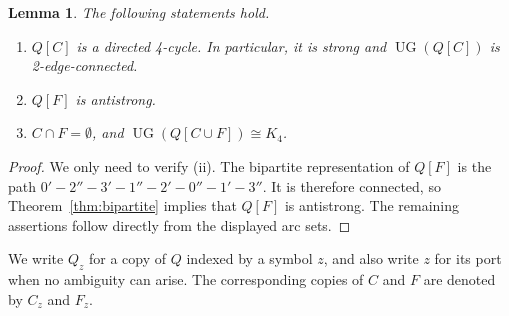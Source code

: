 \documentclass[12pt]{article}
\newtheorem{lemma}[theorem]{Lemma}
\theoremstyle{remark}
\newcommand{\UG}{\operatorname{UG}}
\begin{document}
\begin{lemma}\label{lem:switch}
The following statements hold.
\begin{enumerate}
\renewcommand{\labelenumi}{\textup{(\roman{enumi})}}
\item $Q[C]$ is a directed 4-cycle.  In particular, it is strong and
$\UG(Q[C])$ is 2-edge-connected.
\item $Q[F]$ is antistrong.
\item $C\cap F=\emptyset$, and $\UG(Q[C\cup F])\cong K_4$.
\end{enumerate}
\end{lemma}

\begin{proof}
We only need to verify (ii). The bipartite representation of $Q[F]$ is the path
$0'-2''-3'-1''-2'-0''-1'-3''$.
It is therefore connected, so Theorem~\ref{thm:bipartite} implies that $Q[F]$ is antistrong.  The remaining assertions follow directly from the displayed arc sets.
\end{proof}

We write $Q_z$ for a copy of $Q$ indexed by a symbol $z$, and also
write $z$ for its port when no ambiguity can arise.  The corresponding
copies of $C$ and $F$ are denoted by $C_z$ and $F_z$.
\end{document}
